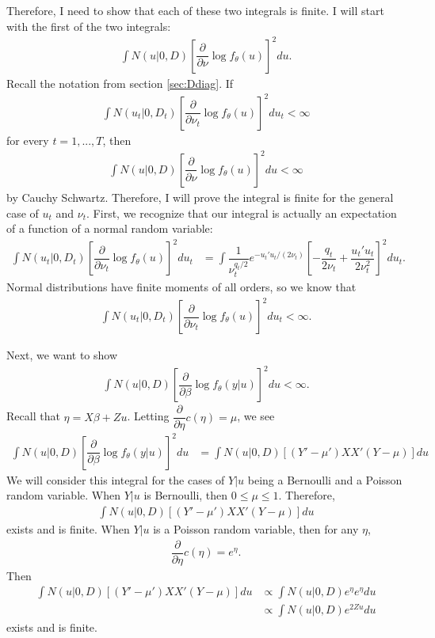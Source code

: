 \documentclass{article}
\begin{document}
Therefore, I need to show that each of these two integrals is finite.  I will start with the first of the two integrals: 
\begin{align}
\int N(u|0,D) \left[  \dfrac{\partial}{\partial \nu} \log f_\theta(u)  \right]^2 du. 
\end{align}
Recall the notation from section \ref{sec:Ddiag}.  If
\begin{align}
\int N(u_t|0,D_t) \left[  \dfrac{\partial}{\partial \nu_t} \log f_\theta(u)  \right]^2 du_t< \infty 
\end{align}
for every $t=1,...,T$, then
\begin{align}
\int N(u|0,D) \left[  \dfrac{\partial}{\partial \nu} \log f_\theta(u)  \right]^2 du < \infty
\end{align}
by Cauchy Schwartz.  Therefore, I will prove the integral is finite for the general case of $u_t$ and $\nu_t$. First, we recognize that our integral is actually an expectation of a function of a normal random variable:
\begin{align}
\int N(u_t|0,D_t) \left[  \dfrac{\partial}{\partial \nu_t} \log f_\theta(u)  \right]^2 du_t &=
\int \dfrac{1}{\nu_t^{q_t/2}} e^{-u_t'u_t/(2 \nu_t)} \left[ -\dfrac{q_t}{2 \nu_t} + \dfrac{u_t'u_t}{2 \nu_t^2}  \right]^2 du_t .
\end{align}
Normal distributions have finite moments of all orders, so we know that\begin{align}
\int N(u_t|0,D_t) \left[  \dfrac{\partial}{\partial \nu_t} \log f_\theta(u)  \right]^2 du_t < \infty.
\end{align}




Next, we want to show 
\begin{align}
\int N(u|0,D) \left[\dfrac{\partial}{\partial \beta} \log f_\theta(y|u)   \right]^2 du < \infty.
\end{align}
 Recall that $\eta=X \beta +Z u$. Letting $\dfrac{\partial}{\partial \eta} c(\eta)=\mu$, we see 
\begin{align}
\int N(u|0,D) \left[\dfrac{\partial}{\partial \beta} \log f_\theta(y|u)   \right]^2 du &= \int N(u|0,D) \left[ (Y'- \mu') X X'(Y- \mu)   \right] du
\end{align}
We will consider this integral for the cases of $Y|u$ being a Bernoulli and a Poisson random variable. When $Y|u$ is Bernoulli, then $0 \leq \mu \leq 1.$ Therefore,
\begin{align}
\int N(u|0,D) \left[ (Y'- \mu') X X'(Y- \mu)   \right] du
\end{align}
exists and is finite.
When $Y|u$ is a Poisson random variable, then for any  $\eta$, 
\begin{align}
\dfrac{\partial}{\partial \eta} c(\eta) = e^\eta.
\end{align}
Then
\begin{align}
\int N(u|0,D) \left[ (Y'- \mu') X X'(Y- \mu)   \right] du &\propto \int N(u|0,D)  e^{\eta} e^{\eta}    du \\
&\propto \int N(u|0,D) e^{2Zu} du 
\end{align}
exists and is finite.
\end{document}

